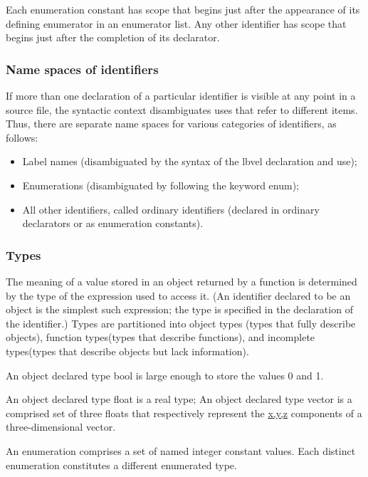 \documentclass{article}
\begin{document}
Each enumeration constant has scope that begins just after the appearance of its defining
enumerator in an enumerator list. Any other identifier has scope that begins just after 
the completion of its declarator.

\subsubsection{Name spaces of identifiers}
If more than one declaration of a particular identifier is visible at any point in a 
source file, the syntactic context disambiguates uses that refer to different items. 
Thus, there  are separate name spaces for various categories of identifiers, as follows:
\linebreak
\begin{itemize}
	\item Label names (disambiguated by the syntax of the lbvel declaration and use);
	\item Enumerations (disambiguated by following the keyword enum);
	\item All other identifiers, called ordinary identifiers (declared in ordinary
	      declarators or as enumeration constants).
\end{itemize}

\subsubsection{Types}
The meaning of a value stored in an object returned by a function is determined by the 
type  of the expression used to access it. (An identifier declared to be an object is the simplest
such expression; the type is specified in the declaration of the identifier.)  Types are 
partitioned into object types (types that fully describe objects), function types(types 
that  describe functions), and incomplete types(types that describe objects but lack 
information).
\linebreak

An object declared type bool is large enough to store the values 0 and 1.
\linebreak

An object declared type float is a real type; An object declared type vector is a 
comprised set of three floats that respectively represent the \underline{x,y,z} 
components of a three-dimensional vector.
\linebreak

An enumeration comprises a set of named integer constant values.  Each distinct 
enumeration constitutes a different enumerated type.
\linebreak
\end{document}
